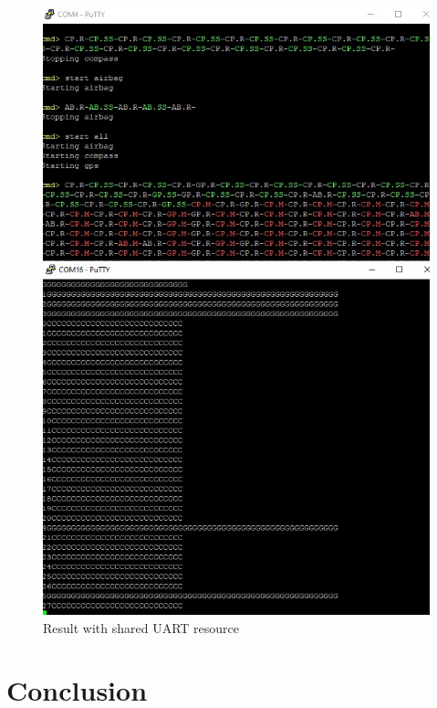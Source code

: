 \documentclass[10pt]{article}
\begin{document}
\begin{figure}[H]
\caption{Result with shared UART resource}
\label{res}
\centering
\includegraphics[width=0.9\linewidth]{./images/result.jpeg}
\end{figure}
\newpage

\section*{Conclusion}
\newpage
\end{document}
